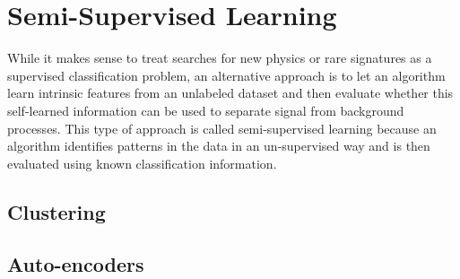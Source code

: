 \section{Semi-Supervised Learning}
\label{sec:semisupervised}
While it makes sense to treat searches for new physics or rare signatures as a supervised classification problem, an alternative approach is to let an algorithm learn intrinsic features from an unlabeled dataset and then evaluate whether this self-learned information can be used to separate signal from background processes. This type of approach is called semi-supervised learning because an algorithm identifies patterns in the data in an un-supervised way and is then evaluated using known classification information.

\subsection{Clustering}


\subsection{Auto-encoders}

